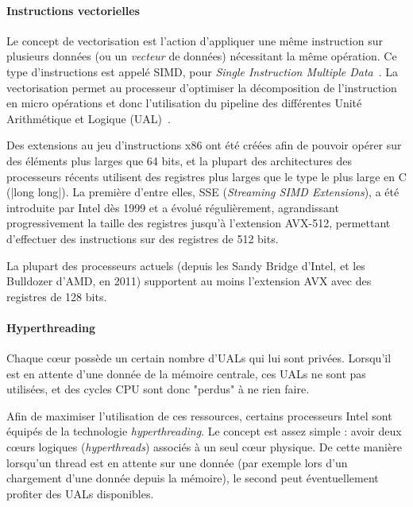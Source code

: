 \paragraph{Instructions vectorielles}\label{sec:context:numa:simd}

Le concept de vectorisation est l'action d'appliquer une même instruction sur plusieurs données (ou un \emph{vecteur} de données) nécessitant la même opération.
Ce type d'instructions est appelé SIMD, pour \emph{Single Instruction Multiple Data}~\cite{Flynn1966}.
La vectorisation permet au processeur d'optimiser la décomposition de l'instruction en micro opérations et donc l'utilisation du pipeline des différentes Unité Arithmétique et Logique (UAL)~\cite{Muller1989}.

Des extensions au jeu d'instructions x86 ont été créées afin de pouvoir opérer sur des éléments plus larges que 64 bits, et la plupart des architectures des processeurs récents utilisent des registres plus larges que le type le plus large en C (|long long|).
La première d'entre elles, SSE (\emph{Streaming SIMD Extensions}), a été introduite par Intel dès 1999 et a évolué régulièrement, agrandissant progressivement la taille des registres jusqu'à l'extension AVX-512, permettant d'effectuer des instructions sur des registres de 512 bits.

La plupart des processeurs actuels (depuis les Sandy Bridge d'Intel, et les Bulldozer d'AMD, en 2011) supportent au moins l'extension AVX avec des registres de 128 bits.

\paragraph{Hyperthreading}

Chaque cœur possède un certain nombre d'UALs qui lui sont privées. Lorsqu'il est en attente d'une donnée de la mémoire centrale, ces UALs ne sont pas utilisées, et des cycles CPU sont donc "perdus" à ne rien faire.

Afin de maximiser l'utilisation de ces ressources, certains processeurs Intel sont équipés de la technologie \emph{hyperthreading}.
Le concept est assez simple : avoir deux cœurs logiques (\emph{hyperthreads}) associés à un seul cœur physique.
De cette manière lorsqu'un thread est en attente sur une donnée (par exemple lors d'un chargement d'une donnée depuis la mémoire), le second peut éventuellement profiter des UALs disponibles.

